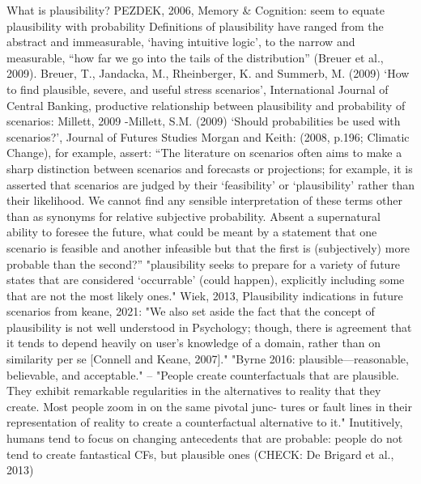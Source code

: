 \textcolor{ACMDarkBlue}{
What is plausibility?
PEZDEK, 2006, Memory \& Cognition: seem to equate plausibility with probability
}\textcolor{ACMDarkBlue}{
Definitions of plausibility have ranged from the abstract and immeasurable, ‘having intuitive logic’, to the narrow and measurable, “how far we go into the tails of the distribution” (Breuer et al., 2009). Breuer, T., Jandacka, M., Rheinberger, K. and Summerb, M. (2009) ‘How to find plausible, severe, and useful stress scenarios’, International Journal of Central Banking, 
}\textcolor{ACMDarkBlue}{
productive relationship between plausibility and probability of scenarios: Millett, 2009 -Millett, S.M. (2009) ‘Should probabilities be used with scenarios?’, Journal of Futures Studies 
}\textcolor{ACMDarkBlue}{
Morgan and Keith: (2008, p.196; Climatic Change), for example, assert: “The literature on scenarios often aims to make a sharp distinction between scenarios and forecasts or projections; for example, it is asserted that scenarios are judged by their ‘feasibility’ or ‘plausibility’ rather than their likelihood. We cannot find any sensible interpretation of these terms other than as synonyms for relative subjective probability. Absent a supernatural ability to foresee the future, what could be meant by a statement that one scenario is feasible and another infeasible but that the first is (subjectively) more probable than the second?” 
}\textcolor{ACMDarkBlue}{
"plausibility seeks to prepare for a variety of future states that are considered ‘occurrable’ (could happen), explicitly including some that are not the most likely ones." Wiek, 2013, Plausibility indications in future scenarios
}\textcolor{ACMDarkBlue}{
from keane, 2021: "We also set aside the fact that the concept of plausibility is not well understood in Psychology; though, there is agreement that it tends to depend heavily on user’s knowledge of a domain, rather than on similarity per se [Connell and Keane, 2007]."
}\textcolor{ACMDarkBlue}{
"Byrne 2016: plausible—reasonable, believable, and acceptable." -- "People create counterfactuals that are plausible. They exhibit remarkable regularities in the alternatives to reality that they create. Most people zoom in on the same pivotal junc- tures or fault lines in their representation of reality to create a counterfactual alternative to it."
}\textcolor{ACMDarkBlue}{
Inutitively, humans tend to focus on changing antecedents that are probable: people do not tend to create fantastical CFs, but plausible ones (CHECK: De Brigard et al., 2013)
}
